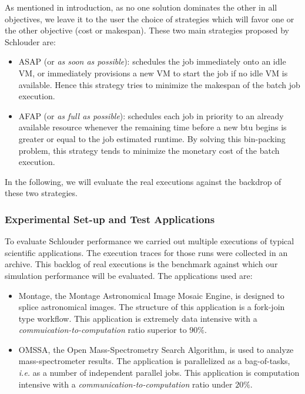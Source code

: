 \documentclass[10pt,conference,compsocconf]{IEEEtran}
\begin{document}
As mentioned in introduction, as no one solution dominates the other in all
objectives, we leave it to the user the choice of strategies which will favor 
one or the other objective (cost or makespan). These two main strategies 
proposed by Schlouder are:
\begin{itemize}
\item ASAP (or \textit{as soon as possible}): schedules the job immediately onto
  an idle VM, or immediately provisions a new VM to start the job if no idle VM 
  is available.  Hence this strategy tries to minimize the makespan
  of the batch job execution.

\item AFAP (or \textit{as full as  possible}): schedules each job in priority to
	an already available resource whenever the remaining time  before a new
	\ac{btu} begins is greater or equal to the job estimated runtime.
	By solving this bin-packing problem, this strategy tends to minimize the
	monetary cost of the batch execution.
\end{itemize}
In the following, we will evaluate the real executions against the backdrop of these two
strategies.

\subsubsection{Experimental Set-up and Test Applications}\label{sc:setup}

To evaluate Schlouder performance we carried out multiple executions of
typical scientific applications. The execution traces for those runs were
collected in an archive. This backlog of real executions is the benchmark
against which our simulation performance will be evaluated. The applications
used are:

\begin{itemize}
	\item Montage\cite{montage2009}, the Montage Astronomical Image Mosaic
		Engine, is designed to splice astronomical images. The structure
                of this application is a fork-join type workflow. This
                application  is extremely data intensive with a
		\emph{commuication-to-computation} ratio superior to $90\%$.
	\item OMSSA\cite{Geer2004}, the Open Mass-Spectrometry Search Algorithm, 
		is used to analyze mass-spectrometer results. The application is
                parallelized as a bag-of-tasks, \textit{i.e.} as a number of
                independent parallel jobs. This application is
		computation intensive with a
		\emph{communication-to-computation} ratio under $20\%$.
\end{itemize}

\end{document}
